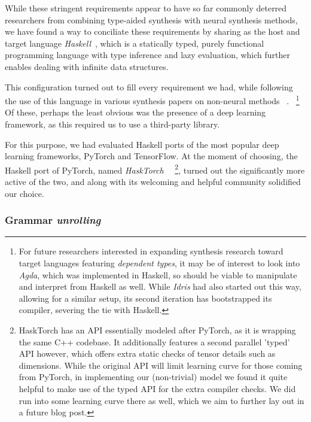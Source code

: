 \documentclass{article}
\begin{document}
While these stringent requirements appear to have so far commonly deterred
researchers from combining type-aided synthesis with neural synthesis methods,
we have found a way to conciliate these requirements
by sharing as the host and target language
\emph{Haskell}~\citep{jones2003haskell}, which is a statically typed,
purely functional programming language with type inference and lazy evaluation,
which further enables dealing with infinite data structures.

This configuration turned out to fill every requirement we had,
while following the use of this language in various synthesis papers on non-neural methods%
~\citep{synquid,hornclauses,scythe,gissurarson2018suggesting}.%
~\footnote{
    For future researchers interested in expanding synthesis research toward target languages featuring \emph{dependent types},
    it may be of interest to look into \emph{Agda},
    which was implemented in Haskell,
    so should be viable to manipulate and interpret from Haskell as well.
    While \emph{Idris} had also started out this way,
    allowing for a similar setup,
    its second iteration has bootstrapped its compiler,
    severing the tie with Haskell.
}
Of these, perhaps the least obvious was the presence of a deep learning framework,
as this required us to use a third-party library.

For this purpose, we had evaluated Haskell ports of
the most popular deep learning frameworks, PyTorch and TensorFlow.
At the moment of choosing, the Haskell port of PyTorch,
named \emph{HaskTorch}~\citep{hasktorch}%
~\footnote{
    HaskTorch has an API essentially modeled after PyTorch, as it is wrapping the same C++ codebase.
    It additionally features a second parallel 'typed' API however,
    which offers extra static checks of tensor details such as dimensions.
    While the original API will limit learning curve for those coming from PyTorch,
    in implementing our (non-trivial) model we found it quite helpful
    to make use of the typed API for the extra compiler checks.
    We did run into some learning curve there as well,
    which we aim to further lay out in a future blog post.
},
turned out the significantly more active of the two,
and along with its welcoming and helpful community solidified our choice.

\subsubsection{Grammar \emph{unrolling}} \label{sec:unroll}
\end{document}
